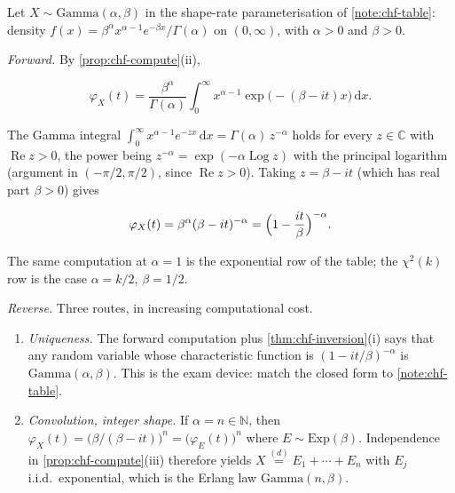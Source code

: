 \documentclass[11pt,a4paper]{article}
\begin{document}
\begin{example}
\label{ex:chf-gamma}
Let \(X\sim\mathrm{Gamma}(\alpha,\beta)\) in the shape-rate parameterisation of \cref{note:chf-table}: density \(f(x)=\beta^{\alpha}x^{\alpha-1}e^{-\beta x}/\Gamma(\alpha)\) on \((0,\infty)\), with \(\alpha>0\) and \(\beta>0\).

\emph{Forward.} By \cref{prop:chf-compute}(ii),

\[
\varphi_{X}(t)
=
\frac{\beta^{\alpha}}{\Gamma(\alpha)}
\int_{0}^{\infty} x^{\alpha-1} \exp\bigl(-(\beta-it)x\bigr)\,\mathrm{d}x.
\]

The Gamma integral \(\int_{0}^{\infty} x^{\alpha-1}e^{-zx}\,\mathrm{d}x=\Gamma(\alpha)\,z^{-\alpha}\) holds for every \(z\in\mathbb{C}\) with \(\operatorname{Re} z>0\), the power being \(z^{-\alpha}=\exp(-\alpha\operatorname{Log} z)\) with the principal logarithm (argument in \((-\pi/2,\pi/2)\), since \(\operatorname{Re} z>0\)). Taking \(z=\beta-it\) (which has real part \(\beta>0\)) gives

\[
\varphi_{X}(t)
=
\beta^{\alpha}(\beta-it)^{-\alpha}
=
\Bigl(1-\frac{it}{\beta}\Bigr)^{-\alpha}.
\]

The same computation at \(\alpha=1\) is the exponential row of the table; the \(\chi^{2}(k)\) row is the case \(\alpha=k/2\), \(\beta=1/2\).

\emph{Reverse.} Three routes, in increasing computational cost.

\begin{enumerate}[label=\textup{(\alph*)}]
    \item
    \emph{Uniqueness.} The forward computation plus \cref{thm:chf-inversion}(i) says that any random variable whose characteristic function is \((1-it/\beta)^{-\alpha}\) is \(\mathrm{Gamma}(\alpha,\beta)\). This is the exam device: match the closed form to \cref{note:chf-table}.

    \item
    \emph{Convolution, integer shape.} If \(\alpha=n\in\mathbb{N}\), then \(\varphi_{X}(t)=\bigl(\beta/(\beta-it)\bigr)^{n}=\bigl(\varphi_{E}(t)\bigr)^{n}\) where \(E\sim\mathrm{Exp}(\beta)\). Independence in \cref{prop:chf-compute}(iii) therefore yields \(X\stackrel{(d)}{=}E_{1}+\cdots+E_{n}\) with \(E_{j}\) i.i.d.\ exponential, which is the Erlang law \(\mathrm{Gamma}(n,\beta)\).


\end{enumerate}
\end{example}
\end{document}
